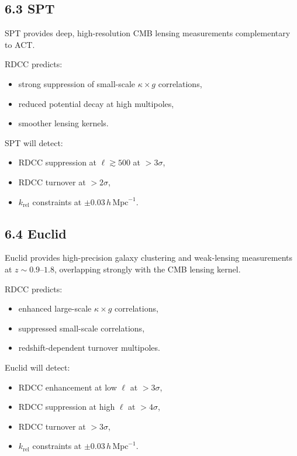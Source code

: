 \documentclass[11pt,a4paper]{article}
\begin{document}
\subsection*{6.3 SPT}

SPT provides deep, high-resolution CMB lensing measurements complementary to ACT.

RDCC predicts:

\begin{itemize}
    \item strong suppression of small-scale $\kappa \times g$ correlations,
    \item reduced potential decay at high multipoles,
    \item smoother lensing kernels.
\end{itemize}

SPT will detect:

\begin{itemize}
    \item RDCC suppression at $\ell \gtrsim 500$ at $>3\sigma$,
    \item RDCC turnover at $>2\sigma$,
    \item $k_{\mathrm{rel}}$ constraints at $\pm 0.03\,h\,\mathrm{Mpc}^{-1}$.
\end{itemize}

\subsection*{6.4 Euclid}

Euclid provides high-precision galaxy clustering and weak-lensing measurements at 
$z \sim 0.9$–$1.8$, overlapping strongly with the CMB lensing kernel.

RDCC predicts:

\begin{itemize}
    \item enhanced large-scale $\kappa \times g$ correlations,
    \item suppressed small-scale correlations,
    \item redshift-dependent turnover multipoles.
\end{itemize}

Euclid will detect:

\begin{itemize}
    \item RDCC enhancement at low $\ell$ at $>3\sigma$,
    \item RDCC suppression at high $\ell$ at $>4\sigma$,
    \item RDCC turnover at $>3\sigma$,
    \item $k_{\mathrm{rel}}$ constraints at $\pm 0.03\,h\,\mathrm{Mpc}^{-1}$.
\end{itemize}
\end{document}
